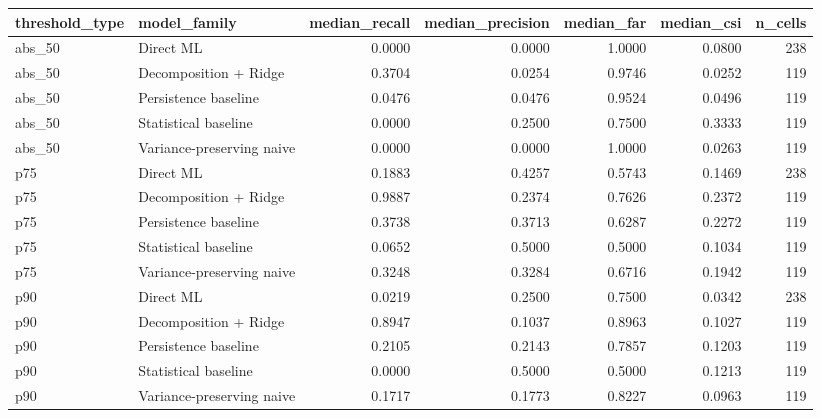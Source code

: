 \begin{tabular}{llrrrrr}
\toprule
threshold\_type & model\_family & median\_recall & median\_precision & median\_far & median\_csi & n\_cells \\
\midrule
abs\_50 & Direct ML & 0.0000 & 0.0000 & 1.0000 & 0.0800 & 238 \\
abs\_50 & Decomposition + Ridge & 0.3704 & 0.0254 & 0.9746 & 0.0252 & 119 \\
abs\_50 & Persistence baseline & 0.0476 & 0.0476 & 0.9524 & 0.0496 & 119 \\
abs\_50 & Statistical baseline & 0.0000 & 0.2500 & 0.7500 & 0.3333 & 119 \\
abs\_50 & Variance-preserving naive & 0.0000 & 0.0000 & 1.0000 & 0.0263 & 119 \\
p75 & Direct ML & 0.1883 & 0.4257 & 0.5743 & 0.1469 & 238 \\
p75 & Decomposition + Ridge & 0.9887 & 0.2374 & 0.7626 & 0.2372 & 119 \\
p75 & Persistence baseline & 0.3738 & 0.3713 & 0.6287 & 0.2272 & 119 \\
p75 & Statistical baseline & 0.0652 & 0.5000 & 0.5000 & 0.1034 & 119 \\
p75 & Variance-preserving naive & 0.3248 & 0.3284 & 0.6716 & 0.1942 & 119 \\
p90 & Direct ML & 0.0219 & 0.2500 & 0.7500 & 0.0342 & 238 \\
p90 & Decomposition + Ridge & 0.8947 & 0.1037 & 0.8963 & 0.1027 & 119 \\
p90 & Persistence baseline & 0.2105 & 0.2143 & 0.7857 & 0.1203 & 119 \\
p90 & Statistical baseline & 0.0000 & 0.5000 & 0.5000 & 0.1213 & 119 \\
p90 & Variance-preserving naive & 0.1717 & 0.1773 & 0.8227 & 0.0963 & 119 \\
\bottomrule
\end{tabular}
